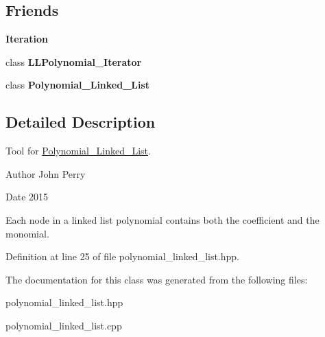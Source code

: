 \subsection*{Friends}
\begin{Indent}\textbf{ Iteration}\par
\begin{DoxyCompactItemize}
\item 
\mbox{\label{class_monomial___node_adc04ceaa684cbc36bd6800c57364bd2e}} 
class {\bfseries L\+L\+Polynomial\+\_\+\+Iterator}
\item 
\mbox{\label{class_monomial___node_a7e28ea806491074003c51b4d857abd6c}} 
class {\bfseries Polynomial\+\_\+\+Linked\+\_\+\+List}
\end{DoxyCompactItemize}
\end{Indent}


\subsection{Detailed Description}
Tool for \hyperlink{class_polynomial___linked___list}{Polynomial\+\_\+\+Linked\+\_\+\+List}. 

\begin{DoxyAuthor}{Author}
John Perry 
\end{DoxyAuthor}
\begin{DoxyDate}{Date}
2015
\end{DoxyDate}
Each node in a linked list polynomial contains both the coefficient and the monomial. 

Definition at line 25 of file polynomial\+\_\+linked\+\_\+list.\+hpp.



The documentation for this class was generated from the following files\+:\begin{DoxyCompactItemize}
\item 
polynomial\+\_\+linked\+\_\+list.\+hpp\item 
polynomial\+\_\+linked\+\_\+list.\+cpp\end{DoxyCompactItemize}
